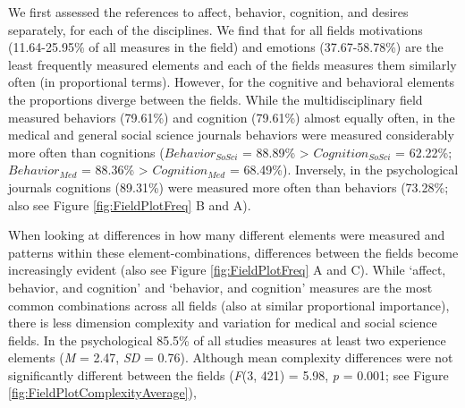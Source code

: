 We first assessed the references to affect, behavior, cognition, and
desires separately, for each of the disciplines. We find that for all
fields motivations (11.64-25.95\% of all measures in the field) and
emotions (37.67-58.78\%) are the least frequently measured elements and
each of the fields measures them similarly often (in proportional
terms). However, for the cognitive and behavioral elements the
proportions diverge between the fields. While the multidisciplinary
field measured behaviors (79.61\%) and cognition (79.61\%) almost
equally often, in the medical and general social science journals
behaviors were measured considerably more often than cognitions
(\(Behavior_{SoSci}\) = 88.89\% \textgreater{} \(Cognition_{SoSci}\) =
62.22\%; \(Behavior_{Med}\) = 88.36\% \textgreater{} \(Cognition_{Med}\)
= 68.49\%). Inversely, in the psychological journals cognitions
(89.31\%) were measured more often than behaviors (73.28\%; also see
Figure \ref{fig:FieldPlotFreq} B and A).

When looking at differences in how many different elements were measured
and patterns within these element-combinations, differences between the
fields become increasingly evident (also see Figure
\ref{fig:FieldPlotFreq} A and C). While `affect, behavior, and
cognition' and `behavior, and cognition' measures are the most common
combinations across all fields (also at similar proportional
importance), there is less dimension complexity and variation for
medical and social science fields. In the psychological 85.5\% of all
studies measures at least two experience elements (\textit{M} = 2.47,
\textit{SD} = 0.76). Although mean complexity differences were not
significantly different between the fields (\textit{F}(3, 421) = 5.98,
\textit{p} = 0.001; see Figure \ref{fig:FieldPlotComplexityAverage}),

